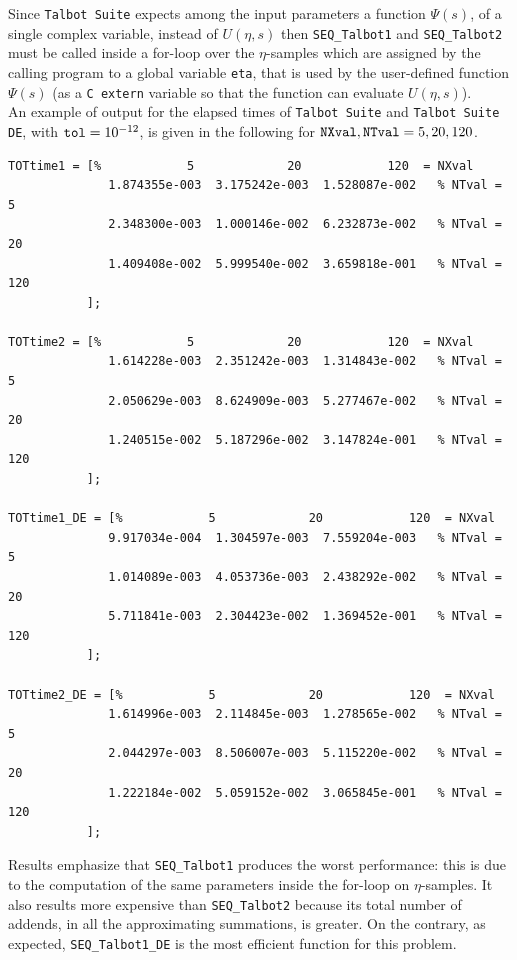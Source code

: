 \documentclass[a4paper,10pt]{report}%
\begin{document}
Since {\tt Talbot Suite} expects among the input parameters a function $\Psi(s)$, of a single complex variable,
instead of $U(\eta,s)$ then {\tt SEQ\_Talbot1} and {\tt SEQ\_Talbot2} must be called inside a for-loop over the
$\eta$-samples which are assigned by the calling program to a global variable {\tt eta}, that is used by the
user-defined function $\Psi(s)$ (as a {\tt C extern} variable so that the function can evaluate $U(\eta,s)$).
\\
An example of output for the elapsed times of {\tt Talbot Suite} and {\tt Talbot Suite DE}, with ${\tt tol}=10^{-12}$, is given in the following for ${\tt NXval},{\tt NTval}=5,20,120$. 
\begin{lstlisting}
TOTtime1 = [%            5             20            120  = NXval
              1.874355e-003  3.175242e-003  1.528087e-002	% NTval =   5
              2.348300e-003  1.000146e-002  6.232873e-002	% NTval =  20
              1.409408e-002  5.999540e-002  3.659818e-001	% NTval = 120
           ];

TOTtime2 = [%            5             20            120  = NXval
              1.614228e-003  2.351242e-003  1.314843e-002	% NTval =   5
              2.050629e-003  8.624909e-003  5.277467e-002	% NTval =  20
              1.240515e-002  5.187296e-002  3.147824e-001	% NTval = 120
           ];

TOTtime1_DE = [%            5             20            120  = NXval
              9.917034e-004  1.304597e-003  7.559204e-003	% NTval =   5
              1.014089e-003  4.053736e-003  2.438292e-002	% NTval =  20
              5.711841e-003  2.304423e-002  1.369452e-001	% NTval = 120
           ];

TOTtime2_DE = [%            5             20            120  = NXval
              1.614996e-003  2.114845e-003  1.278565e-002	% NTval =   5
              2.044297e-003  8.506007e-003  5.115220e-002	% NTval =  20
              1.222184e-002  5.059152e-002  3.065845e-001	% NTval = 120
           ];
\end{lstlisting}
Results emphasize that {\tt SEQ\_Talbot1} produces the worst performance: this is due to the computation of
the same parameters inside the for-loop on $\eta$-samples.
It also results more expensive than {\tt SEQ\_Talbot2} because its total number of addends, in all the
approximating summations, is greater. On the contrary, as expected, {\tt SEQ\_Talbot1\_DE} is the most
efficient function for this problem.



\end{document}
